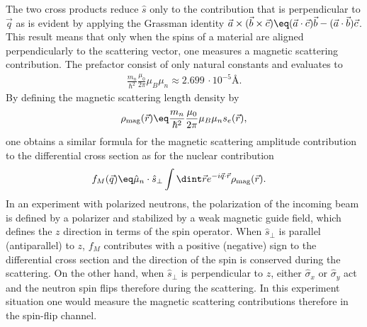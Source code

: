\documentclass[\main/dresen_thesis.tex]{subfiles}
\begin{document}
The two cross products reduce $\hat{s}$ only to the contribution that is perpendicular to $\vec{q}$ as is evident by applying the Grassman identity $\vec{a} \times (\vec{b} \times \vec{c}) \eq (\vec{a} \cdot \vec{c}) \vec{b} - (\vec{a} \cdot \vec{b}) \vec{c}$.
This result means that only when the spins of a material are aligned perpendicularly to the scattering vector, one measures a magnetic scattering contribution.
The prefactor consist of only natural constants and evaluates to
\begin{align}
  \frac{m_n}{\hbar^2}  \frac{\mu_0}{2\pi} \mu_B \mu_n \approx 2.699\,\cdot 10^{-5} \unit{\angstrom}.
\end{align}
By defining the magnetic scattering length density by
\begin{align}
  \rho_\mathrm{mag} (\vec{r}) \eq \frac{m_n}{\hbar^2}  \frac{\mu_0}{2\pi} \mu_B \mu_n s_e (\vec{r}),
\end{align}
one obtains a similar formula for the magnetic scattering amplitude contribution to the differential cross section as for the nuclear contribution
\begin{align}
  f_M (\vec{q}) \eq & \hat{\mu}_n \cdot \hat{s}_\perp \int \dint \vec{r} e^{- i \vec{q} \cdot \vec{r}} \rho_\mathrm{mag}(\vec{r}).
\end{align}
In an experiment with polarized neutrons, the polarization of the incoming beam is defined by a polarizer and stabilized by a weak magnetic guide field, which defines the $z$ direction in terms of the spin operator.
When $\hat{s}_\perp$ is parallel (antiparallel) to $z$, $f_M$ contributes with a positive (negative) sign to the differential cross section and the direction of the spin is conserved during the scattering.
On the other hand, when $\hat{s}_\perp$ is perpendicular to $z$, either $\hat{\sigma}_x$ or $\hat{\sigma}_y$ act and the neutron spin flips therefore during the scattering.
In this experiment situation one would measure the magnetic scattering contributions therefore in the spin-flip channel.
\end{document}
